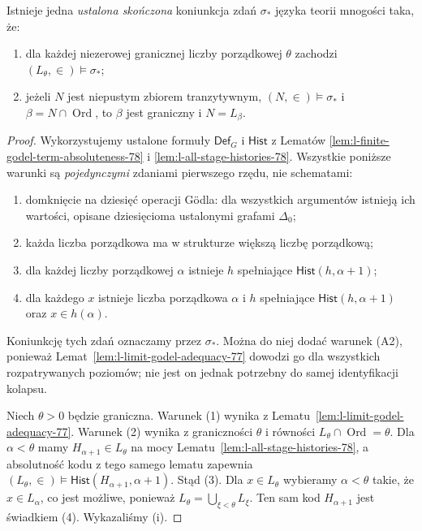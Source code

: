 \begin{lemat}
\label{lem:l-finite-condensation-package}
Istnieje jedna \emph{ustalona skończona} koniunkcja
zdań $\sigma_*$ języka teorii mnogości taka, że:
\begin{enumerate}[label=(\roman*)]
\item dla każdej niezerowej granicznej liczby
  porządkowej $\theta$ zachodzi
  $(L_\theta,\in)\models\sigma_*$;
\item jeżeli $N$ jest niepustym zbiorem tranzytywnym,
  $(N,\in)\models\sigma_*$ i
  $\beta=N\cap\operatorname{Ord}$, to $\beta$ jest
  graniczny i $N=L_\beta$.
\end{enumerate}
\end{lemat}
\begin{proof}
Wykorzystujemy ustalone formuły
$\mathsf{Def}_G$ i $\mathsf{Hist}$ z Lematów
\ref{lem:l-finite-godel-term-absoluteness-78} i
\ref{lem:l-all-stage-histories-78}.
Wszystkie poniższe warunki są \emph{pojedynczymi}
zdaniami pierwszego rzędu, nie schematami:
\begin{enumerate}[label=(\arabic*)]
\item domknięcie na dziesięć operacji Gödla:
 dla wszystkich argumentów istnieją ich wartości,
 opisane dziesięcioma ustalonymi grafami $\Delta_0$;
\item każda liczba porządkowa ma w strukturze
 większą liczbę porządkową;
\item dla każdej liczby porządkowej $\alpha$
 istnieje $h$ spełniające
 $\mathsf{Hist}(h,\alpha+1)$;
\item dla każdego $x$ istnieje liczba porządkowa
 $\alpha$ i $h$ spełniające
 $\mathsf{Hist}(h,\alpha+1)$ oraz $x\in h(\alpha)$.
\end{enumerate}
Koniunkcję tych zdań oznaczamy przez $\sigma_*$.
Można do niej dodać warunek (A2), ponieważ
Lemat~\ref{lem:l-limit-godel-adequacy-77}
dowodzi go dla wszystkich rozpatrywanych poziomów;
nie jest on jednak potrzebny do samej identyfikacji
kolapsu.

Niech $\theta>0$ będzie graniczna. Warunek (1)
wynika z Lematu~\ref{lem:l-limit-godel-adequacy-77}.
Warunek (2) wynika z graniczności $\theta$ i
równości $L_\theta\cap\operatorname{Ord}=\theta$.
Dla $\alpha<\theta$ mamy
$H_{\alpha+1}\in L_\theta$ na mocy
Lematu~\ref{lem:l-all-stage-histories-78}, a
absolutność kodu z tego samego lematu zapewnia
$(L_\theta,\in)\models\mathsf{Hist}(H_{\alpha+1},\alpha+1)$.
Stąd (3). Dla $x\in L_\theta$ wybieramy
$\alpha<\theta$ takie, że $x\in L_\alpha$,
co jest możliwe, ponieważ
$L_\theta=\bigcup_{\xi<\theta}L_\xi$.
Ten sam kod $H_{\alpha+1}$ jest świadkiem (4).
Wykazaliśmy (i).


\end{proof}
